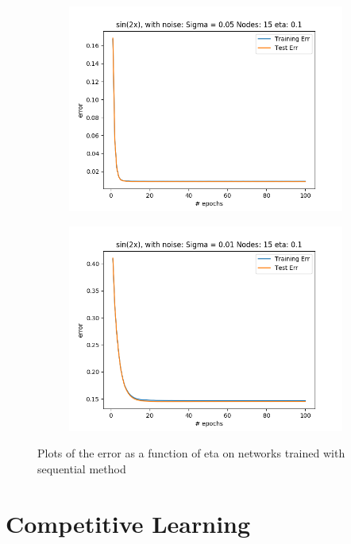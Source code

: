 \documentclass{article}
\begin{document}
\begin{figure}[ht!]
\begin{subfigure}[t]{0.4\textwidth}
        \includegraphics[width=1\textwidth]{plots/noise/seq_sin2x_15nodes_sigma1_error_per_epoch_eta005.png}
        \caption{}
    \end{subfigure}
    \begin{subfigure}[t]{0.4\textwidth}
        \centering
        \includegraphics[width=1\textwidth]{plots/noise/seq_sin2x_15nodes_sigma1_error_per_epoch_eta001.png}
        \caption{}
    \end{subfigure}
    \caption{Plots of the error as a function of eta on networks trained with sequential method}
\end{figure}

\section{Competitive Learning}
\end{document}
